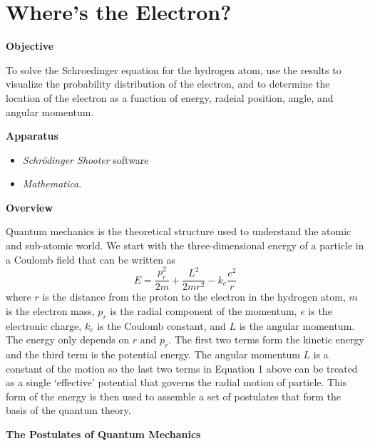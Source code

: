 \section{Where's the Electron?}

\makelabheader %

\textbf{Objective}

To solve the Schroedinger equation for the hydrogen atom,
use the results to visualize the probability distribution of the electron, and to
determine the location of the electron as a function of energy, radeial position, angle, 
and angular momentum.

\textbf{Apparatus}

\begin{itemize}

\item {\it Schr\"odinger Shooter} software

\item {\it Mathematica}.

\end{itemize}

\textbf{Overview}

Quantum mechanics is the theoretical structure used to understand the atomic and sub-atomic
world. 
We start with the three-dimensional
energy of a particle in a Coulomb field that can be written as
\begin{equation}
E = \frac{p_r^2}{2m} + \frac{L^2}{2mr^2} - k_e\frac{e^2}{r}
\end{equation}\label{eq:probdens1}
\noindent where $r$ is the distance from the proton to the electron in the hydrogen atom,
$m$ is the electron mass, $p_r$ is the radial component of the momentum, 
$e$ is the electronic charge, $k_e$ is the Coulomb constant, and
$L$ is the angular momentum.
The energy only depends on $r$ and $p_r$.
The first two terms form the kinetic energy and the third term is the potential energy.
The angular momentum $L$ is a constant of the motion so the last two terms in 
Equation 1 above can be treated as a single `effective' potential 
that governs the radial motion of particle.
This form of the energy is then used to assemble a set of postulates that form
the basis of the quantum theory.

\begin{center}
{\bf The Postulates of Quantum Mechanics}
\end{center}

